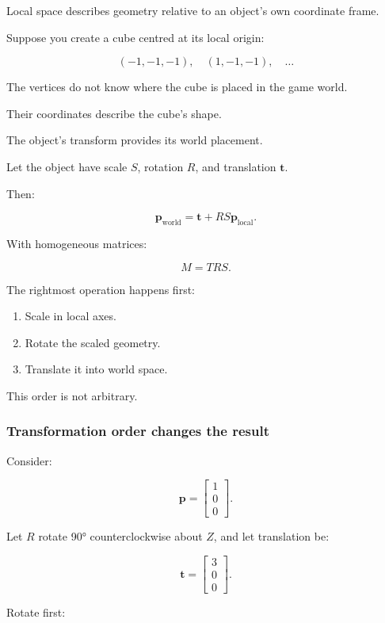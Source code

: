 Local space describes geometry relative to an object's own coordinate frame.

Suppose you create a cube centred at its local origin:

\[
 (-1,-1,-1),\quad (1,-1,-1),\quad\ldots
\]

The vertices do not know where the cube is placed in the game world.

Their coordinates describe the cube's shape.

The object's transform provides its world placement.

Let the object have scale \(S\), rotation \(R\), and translation \(\mathbf t\).

Then:

\[
 \boxed{ \mathbf p_{\mathrm{world}} = \mathbf t+RS\mathbf p_{\mathrm{local}} }.
\]

With homogeneous matrices:

\[
 \boxed{ M=TRS }.
\]

The rightmost operation happens first:

\begin{enumerate}
\def\labelenumi{\arabic{enumi}.}
\tightlist
\item
  Scale in local axes.
\item
  Rotate the scaled geometry.
\item
  Translate it into world space.
\end{enumerate}

This order is not arbitrary.

\subsubsection{Transformation order changes the result}\label{02-foundations-ii-ch032-transformation-order-changes-the-result}

Consider:

\[
 \mathbf p= \begin{bmatrix}1\\0\\0\end{bmatrix}.
\]

Let \(R\) rotate 90° counterclockwise about \(Z\), and let translation be:

\[
 \mathbf t= \begin{bmatrix}3\\0\\0\end{bmatrix}.
\]

Rotate first:

